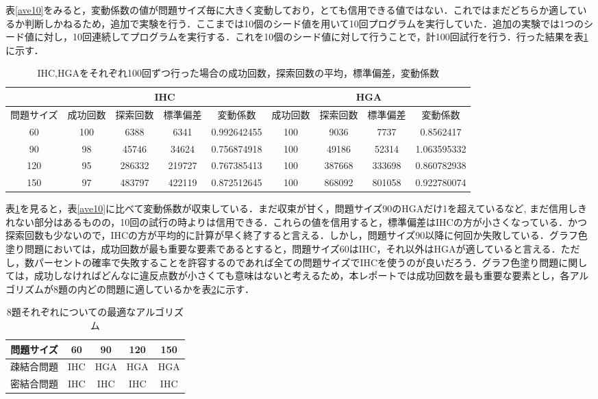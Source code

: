 \documentclass[a4j]{jarticle}
\begin{document}
表\ref{ave10}をみると，変動係数の値が問題サイズ毎に大きく変動しており，とても信用できる値ではない．これではまだどちらか適しているか判断しかねるため，追加で実験を行う．ここまでは10個のシード値を用いて10回プログラムを実行していた．追加の実験では1つのシード値に対し，10回連続してプログラムを実行する．これを10個のシード値に対して行うことで，計100回試行を行う．行った結果を表\ref{ave100}に示す．
 \begin{table}[H]
  \begin{center}
   \caption{IHC,HGAをそれぞれ100回ずつ行った場合の成功回数，探索回数の平均，標準偏差，変動係数}
   \label{ave100}
   \begin{tabular}[t]{|c||c|c|c|c|c|c|c|c|} \hline
     & \multicolumn{4}{|c|}{IHC} & \multicolumn{4}{|c|}{HGA}  \\\hline
問題サイズ & 成功回数 & 探索回数 & 標準偏差 & 変動係数 & 成功回数 & 探索回数 & 標準偏差 & 変動係数 \\\hline\hline
60 & 100 & 6388 & 6341 & 0.992642455 & 100 & 9036 & 7737 & 0.8562417 \\\hline
90 & 98 & 45746 & 34624 & 0.756874918 & 100 & 49186 & 52314 & 1.063595332 \\\hline
120 & 95 & 286332 & 219727 & 0.767385413 & 100 & 387668 & 333698 & 0.860782938 \\\hline
150 & 97 & 483797 & 422119 & 0.872512645 & 100 & 868092 & 801058 & 0.922780074 \\\hline
   \end{tabular}
  \end{center}
 \end{table}
表\ref{ave100}を見ると，表\ref{ave10}に比べて変動係数が収束している．まだ収束が甘く，問題サイズ90のHGAだけ1を超えているなど,
まだ信用しきれない部分はあるものの，10回の試行の時よりは信用できる．これらの値を信用すると，標準偏差はIHCの方が小さくなっている．かつ探索回数も少ないので，IHCの方が平均的に計算が早く終了すると言える．しかし，問題サイズ90以降に何回か失敗している．グラフ色塗り問題においては，成功回数が最も重要な要素であるとすると，問題サイズ60はIHC，それ以外はHGAが適していると言える．ただし，数パーセントの確率で失敗することを許容するのであれば全ての問題サイズでIHCを使うのが良いだろう．グラフ色塗り問題に関しては，成功しなければどんなに違反点数が小さくても意味はないと考えるため，本レポートでは成功回数を最も重要な要素とし，各アルゴリズムが8題の内どの問題に適しているかを表\ref{fit}に示す．
\begin{table}[ht]
 \begin{center}
  \caption{8題それぞれについての最適なアルゴリズム}
  \label{fit}
  \begin{tabular}[t]{|c|c|c|c|c|} \hline
   問題サイズ&60 &90 &120 &150 \\ \hline\hline
   疎結合問題&IHC &HGA &HGA &HGA \\ \hline
   密結合問題&IHC &IHC &IHC &IHC \\ \hline
  \end{tabular}
 \end{center}
\end{table}
\end{document}
